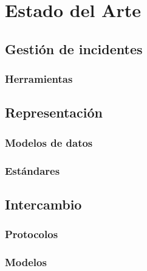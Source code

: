 \chapter{Estado del Arte}
\label{capitulo2}

\section{Gestión de incidentes}
\label{gestiondeincidentes}
\subsection{Herramientas}
\label{herramientas}


\section{Representación}
\label{representacion}
\subsection{Modelos de datos}
\label{modelodedatos}



%


\subsection{Estándares}
\label{estandares}
\section{Intercambio}
\label{intercambio}
\subsection{Protocolos}
\label{protocolos}
 
 
\subsection{Modelos}
\label{modelos}
 
